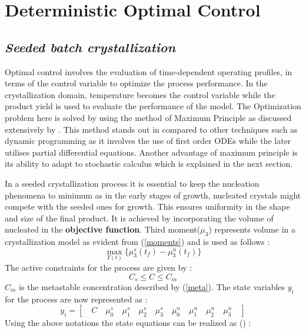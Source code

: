 \documentclass[3p,times,authoryear]{elsarticle}
\begin{document}
\section{Deterministic Optimal Control}\label{secdet}

\subsection{\textit{Seeded batch crystallization}}
Optimal control involves the evaluation of time-dependent operating profiles, in terms of the control variable to optimize the process performance. In the crystallization domain, temperature becomes the control variable while the product yield is used to evaluate the performance of the model. The Optimization problem here is solved by using the method of Maximum Principle as discussed extensively by \cite{diwekar}. This method stands out in compared to other techniques such as dynamic programming as it involves the use of first order ODEs while the later utilises partial differential equations. Another advantage of maximum principle is its ability to adapt to stochastic calculus which is explained in the next section. \par 
In a seeded crystallization process it is essential to keep the nucleation phenomena to minimum as in the early stages of growth, nucleated crystals might compete with the seeded ones for growth. This ensures uniformity in the shape and size of the final product. It is achieved by incorporating the volume of nucleated in the \textbf{objective function}. Third moment($\mu_{3}$) represents volume in a crystallization model as evident from (\ref{moments}) and is used as follows :
\begin{equation}
\max_{T(t)}\lbrace{\mu_{3}^{s}(t_{f}) - \mu_{3}^{n}(t_{f})\rbrace } 
\end{equation}
The active constraints for the process are given by : 
\begin{equation}
C_{s}\leqslant C \leqslant C_{m}
\end{equation}
$C_{m}$ is the metastable concentration described by (\ref{meta}). The state variables $y_{i}$ for the process are now represented as : 
\begin{equation} \label{states}
y_{i} = \left[\quad C \quad \mu_{0}^{s} \quad \mu_{1}^{s}\quad \mu_{2}^{s}\quad \mu_{3}^{s}\quad \mu_{0}^{n}\quad \mu_{1}^{n}\quad \mu_{2}^{n}\quad \mu_{3}^{n}\quad\right]  
\end{equation}
Using the above notations the state equations can be realized as (\cite{yenkie}) :
\end{document}
